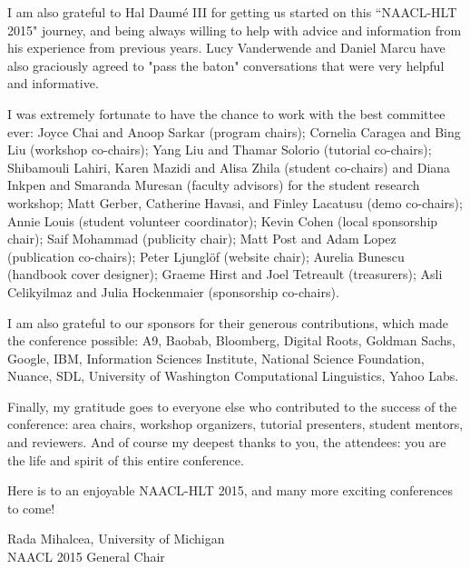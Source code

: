 I am also grateful to Hal Daumé III for getting us started on this ``NAACL-HLT 2015" journey, and being always willing to help with advice and information from his experience from previous years. Lucy Vanderwende and Daniel Marcu have also graciously agreed to "pass the baton" conversations that were very helpful and informative. 

I was extremely fortunate to have the chance to work with the best committee ever: Joyce Chai and Anoop Sarkar (program chairs); Cornelia Caragea and Bing Liu (workshop co-chairs); Yang Liu and Thamar Solorio (tutorial co-chairs); Shibamouli Lahiri, Karen Mazidi and Alisa Zhila (student co-chairs) and Diana Inkpen and Smaranda Muresan (faculty advisors) for the student research workshop; Matt Gerber, Catherine Havasi, and Finley Lacatusu (demo co-chairs); Annie Louis (student volunteer coordinator); Kevin Cohen (local sponsorship chair); Saif Mohammad (publicity chair); Matt Post and Adam Lopez (publication co-chairs); Peter Ljungl\"{o}f (website chair); Aurelia Bunescu (handbook cover designer); Graeme Hirst and Joel Tetreault (treasurers); Asli Celikyilmaz and Julia Hockenmaier (sponsorship co-chairs). 

I am also grateful to our sponsors for their generous contributions, which made the conference possible: A9,  Baobab, Bloomberg,  Digital Roots, Goldman Sachs,  Google, IBM,  Information Sciences Institute, National Science Foundation, Nuance, SDL, University of Washington Computational Linguistics, Yahoo Labs.

Finally, my gratitude goes to everyone else who contributed to the success of the conference: area chairs, workshop organizers, tutorial presenters, student mentors, and reviewers. And of course my deepest thanks to you, the attendees: you are the life and spirit of this entire conference. 

Here is to an enjoyable NAACL-HLT 2015, and many more exciting conferences to come!

\vskip 0.5in
\noindent Rada Mihalcea, University of Michigan\\
NAACL 2015 General Chair

